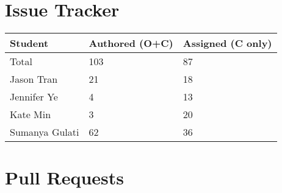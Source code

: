\documentclass{article}
\begin{document}
\section{Issue Tracker}

\begin{table}[H]
\centering
\begin{tabular}{lll}
\toprule
\textbf{Student} & \textbf{Authored (O+C)} & \textbf{Assigned (C only)}\\
\midrule
Total & 103 & 87 \\
Jason Tran & 21 & 18 \\
Jennifer Ye & 4 & 13 \\
Kate Min & 3 & 20 \\
Sumanya Gulati & 62 & 36 \\
\bottomrule
\end{tabular}
\end{table}



\section{Pull Requests}
\end{document}
